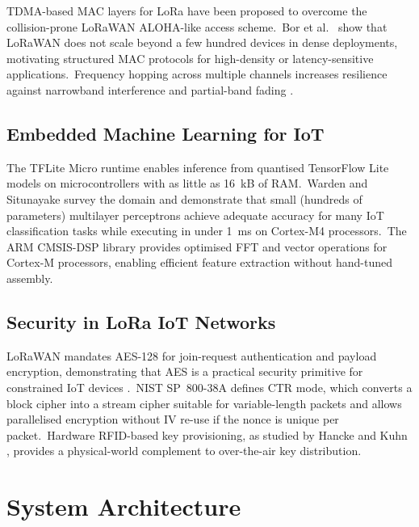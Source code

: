 \documentclass[conference]{IEEEtran}
\begin{document}
TDMA-based MAC layers for LoRa have been proposed to overcome the
collision-prone LoRaWAN ALOHA-like access scheme.\ Bor et al.\
\cite{bor_lorawan_scale_2016} show that LoRaWAN does not scale beyond
a few hundred devices in dense deployments, motivating structured MAC
protocols for high-density or latency-sensitive applications.\ Frequency
hopping across multiple channels increases resilience against
narrowband interference and partial-band fading \cite{raza_lpwan_survey_2017}.

\subsection{Embedded Machine Learning for IoT}

The TFLite Micro runtime \cite{david_tflite_micro_2021} enables
inference from quantised TensorFlow Lite models on microcontrollers
with as little as 16~kB of RAM.\ Warden and Situnayake
\cite{warden_tinyml_2019} survey the domain and demonstrate that small
(hundreds of parameters) multilayer perceptrons achieve adequate
accuracy for many IoT classification tasks while executing in under
1~ms on Cortex-M4 processors.\ The ARM CMSIS-DSP library
\cite{arm_cmsis_dsp} provides optimised FFT and vector operations for
Cortex-M processors, enabling efficient feature extraction without
hand-tuned assembly.

\subsection{Security in LoRa IoT Networks}

LoRaWAN mandates AES-128 for join-request authentication and
payload encryption, demonstrating that AES is a practical security
primitive for constrained IoT devices \cite{lorawan_spec}.\ NIST
SP~800-38A \cite{nist_sp800_38a} defines CTR mode, which converts a
block cipher into a stream cipher suitable for variable-length packets
and allows parallelised encryption without IV re-use if the nonce is
unique per packet.\ Hardware RFID-based key provisioning, as studied
by Hancke and Kuhn \cite{hancke_rfid_security_2005}, provides a
physical-world complement to over-the-air key distribution.

\section{System Architecture}
\label{sec:arch}
\end{document}
